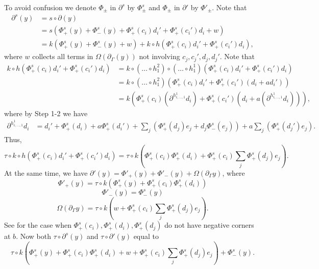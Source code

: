 \documentclass[11pt]{amsart}
\makeatletter
\renewenvironment{proof}[1][\proofname] {\par\pushQED{\qed}{\normalfont\bfseries\topsep6\p@\@plus6\p@\relax #1\@addpunct{.} }}{\popQED\endtrivlist\@endpefalse}
\theoremstyle{mystyle}
\newcommand{\<}{\langle}
\renewcommand{\>}{\rangle}
\makeatother
\begin{document}
\begin{proof}
\begin{proof}
		 To avoid confusion we denote $\Phi_\pm$ in $\partial^s$ by $\Phi^s_\pm$ and $\Phi_\pm$ in $\partial'$ by $\Phi'_{\pm}$. Note that \begin{align*}
			\partial^s (y) &= s \circ \partial (y) \\
			&= s (\Phi_+^s(y) + \Phi_-^s(y) + \Phi_+^s(c_i) d_i' + \Phi_+^s(c_i') d_i + w) \\
			&= k(\Phi_+^s(y) + \Phi_-^s(y) + w) + k \circ h(\Phi_+^s(c_i) d_i' + \Phi_+^s(c_i') d_i),
		\end{align*} where $w$ collects all terms in $\Omega(\partial_\Gamma (y))$ not involving $c_j, c_j', d_j, d_j'$. Note that \begin{align*}
			k \circ h(\Phi_+^s(c_i) d_i' + \Phi_+^s(c_i') d_i) &= k \circ (\dots \circ h_1^2) \circ (\dots \circ h_1^1)(\Phi_+^s(c_i) d_i' + \Phi_+^s(c_i') d_i) \\
			&= k \circ (\dots \circ h_1^2)(\Phi_+^s(c_i) d_i' + \Phi_+^s(c_i') (d_i + a d_i')) \\
			&= k(\Phi_+^s(c_i) (\partial^{h_{i, \dots , 1}^1} d_i) + \Phi_+^s(c_i')(d_i + a(\partial^{h_{i, \dots , 1}^1} d_i))),
		\end{align*} where by Step 1-2 we have \begin{align*}
			\partial^{h_{i, \dots , 1}^1} d_i &= d_i' + \Phi_+^s(d_i) + a\Phi_+^s(d_i') + \sum_j (\Phi_+^s(d_j)e_j + d_j\Phi_-^s(e_j)) + a\sum_j (\Phi_+^s(d_j')e_j).
		\end{align*} Thus, \[\tau \circ k \circ h (\Phi_+^s(c_i) d_i' + \Phi_+^s(c_i') d_i) = \tau \circ k(\Phi_+^s(c_i)\Phi_+^s(d_i) + \Phi_+^s(c_i)\sum_j \Phi_+^s(d_j) e_j).\] At the same time, we have $\partial'(y) = \Phi'_+(y) + \Phi'_-(y) + \Omega(\partial_\Gamma y)$, where \[\Phi'_+(y) = \tau \circ k(\Phi_+^s(y) + \Phi_+^s(c_i)\Phi_+^s(d_i))\] \[\Phi'_-(y) = \Phi_-^s(y)\] \[\Omega(\partial_\Gamma y) = \tau \circ k (w + \Phi_+^s(c_i)\sum_j \Phi_+^s(d_j) e_j).\] See  for the case when $\Phi^s_+(c_i), \Phi^s_+(d_i), \Phi^s_+(d_j)$ do not have negative corners at $b$. Now both $\tau \circ \partial^s(y)$ and $\tau \circ \partial'(y)$ equal to \[\tau \circ k(\Phi_+^s(y) + \Phi_+^s(c_i)\Phi_+^s(d_i) + w + \Phi_+^s(c_i)\sum_j \Phi_+^s(d_j) e_j) + \Phi_-^s(y).\]
 \begin{figure}[h]
            \begin{center}
\begin{tikzpicture}[x=0.75pt,y=0.75pt,yscale=-1,xscale=1]


\end{tikzpicture}
\end{center}
\end{figure}
\end{proof}
\end{proof}
\end{document}
